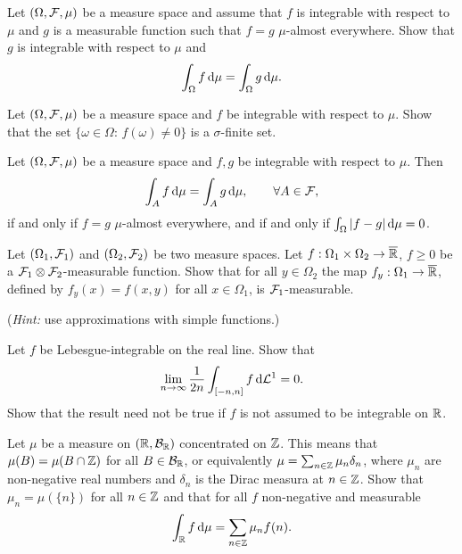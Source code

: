 \begin{problem} Let $(\Omega,\mathcal F,\mu)$ be a measure space and assume that $f$ is integrable with respect to $\mu$ and $g$ is a measurable function such that $f = g$ $\mu$-almost everywhere. Show that $g$ is integrable with respect to $\mu$ and 
    \begin{equation*}
        \int_\Omega f\, \mathrm{d} \mu =  \int_\Omega g\, \mathrm{d} \mu.
    \end{equation*}
\end{problem}

\begin{problem}  Let $(\Omega,\mathcal F,\mu)$ be a measure space and $f$ be integrable with respect to $\mu$. Show that the set $\{\omega\in \Omega :\, f(\omega) \neq 0 \}$ is a $\sigma$-finite set. 
\end{problem}

\begin{problem}
    Let $(\Omega,\mathcal F,\mu)$ be a measure space and $f,g$ be integrable with respect to $\mu$. Then 
    \begin{equation*}
        \int_A f \,\mathrm{d} \mu = \int_A g \,\mathrm{d} \mu,\qquad \forall A\in\mathcal F,
    \end{equation*}
    if and only if $f = g$ $\mu$-almost everywhere, and if and only if $\int_{\Omega}|f-g|\,\mathrm{d} \mu = 0$.
\end{problem}

\begin{problem}
    Let $(\Omega_1,\mathcal F_1)$ and $(\Omega_2,\mathcal F_2)$ be two measure spaces. Let $f:\Omega_1\times\Omega_2\to \overline{\mathbb R}$, $f\geq 0$ be a $\mathcal F_1\otimes \mathcal F_2$-measurable function. Show that for all $y\in \Omega_2$ the map $f_y : \Omega_1\to \overline{\mathbb R}$, defined by $f_y(x) = f(x,y)$ for all $x\in \Omega_1$, is $\mathcal F_1$-measurable.

    \noindent (\emph{Hint:} use approximations with simple functions.)
\end{problem}

\begin{problem}
    Let $f$ be Lebesgue-integrable on the real line. Show that
    \begin{equation*}
        \lim_{n\to\infty} \frac{1}{2 n} \int_{[-n,n]} f \,\mathrm{d}\mathcal L^1 = 0.
    \end{equation*}
    Show that the result need not be true if $f$ is not assumed to be integrable on $\mathbb R$.
\end{problem}

\begin{problem} Let $\mu$ be a measure on $(\mathbb R,\mathcal B_{\mathbb R})$ concentrated on $\mathbb Z$. This means that $\mu(B) = \mu(B\cap \mathbb Z)$ for all $B\in \mathcal B_{\mathbb R}$, or equivalently 
$\mu = \sum_{n\in \mathbb Z}\mu_n \delta_n$, where $\mu_n$ are non-negative real numbers and $\delta_n$ is the Dirac measura at $n\in \mathbb Z$. Show that $\mu_n = \mu(\{n\})$ for all $n\in \mathbb Z$ and that  for all $f$ non-negative and measurable
\begin{equation*}
    \int_{\mathbb R} f\,\mathrm{d} \mu = \sum_{n\in \mathbb Z} \mu_n f(n).
\end{equation*}
\end{problem}

